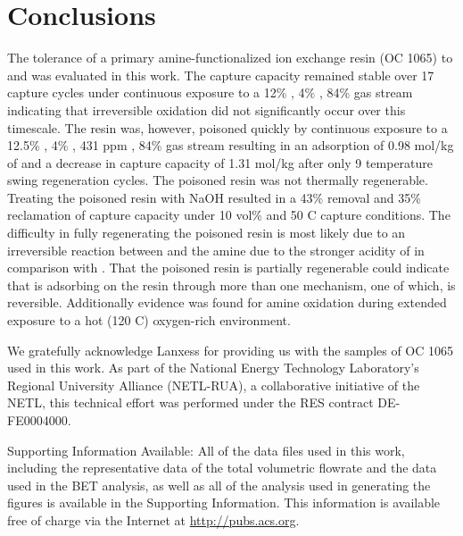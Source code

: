 \documentclass[journal=iecred,manuscript=article]{achemso}
\begin{document}
\section{Conclusions}
\label{sec-4}
The tolerance of a primary amine-functionalized ion exchange resin (OC 1065) to   and   was evaluated in this work. The   capture capacity remained stable over 17 capture cycles under continuous exposure to a 12\% , 4\% , 84\%   gas stream indicating that irreversible oxidation did not significantly occur over this timescale. The resin was, however, poisoned quickly by continuous exposure to a 12.5\% , 4\% , 431 ppm , 84\%  gas stream resulting in an adsorption of 0.98 mol/kg of   and a decrease in   capture capacity of 1.31 mol/kg after only 9 temperature swing regeneration cycles. The poisoned resin was not thermally regenerable. Treating the poisoned resin with NaOH resulted in a 43\%   removal and 35\% reclamation of   capture capacity under 10 vol\%   and 50 \textdegree{}C capture conditions. The difficulty in fully regenerating the poisoned resin is most likely due to an irreversible reaction between   and the amine due to the stronger acidity of   in comparison with . That the poisoned resin is partially regenerable could indicate that  is adsorbing on the resin through more than one mechanism, one of which, is reversible. Additionally evidence was found for amine oxidation during extended exposure to a hot (120 \textdegree{}C)  oxygen-rich environment.


\begin{acknowledgement}
We gratefully acknowledge Lanxess for providing us with the samples of OC 1065 used in this work. As part of the National Energy Technology Laboratory's Regional University Alliance (NETL-RUA), a collaborative initiative of the 
NETL, this technical effort was performed under the RES contract DE-FE0004000. 
\end{acknowledgement}


Supporting Information Available: All of the data files used in this work, including the representative data of the total volumetric flowrate and the data used in the BET analysis, as well as all of the analysis used in generating the figures is available in the Supporting Information.  This information is available free of charge via the Internet at \url{http://pubs.acs.org}.


\end{document}
